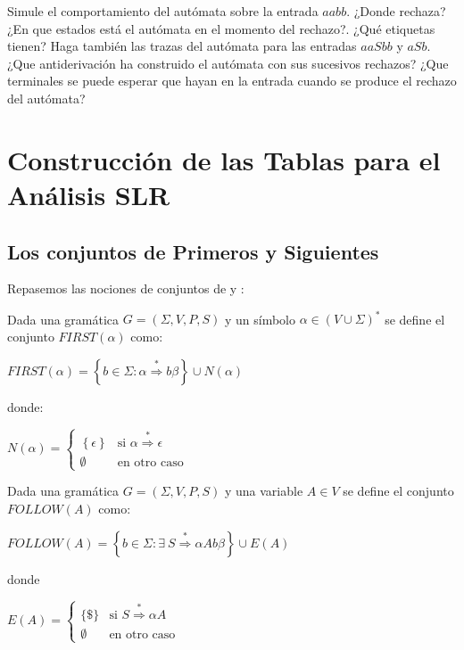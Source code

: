 \begin{exercise}
Simule el comportamiento del autómata sobre la entrada $aabb$. ¿Donde rechaza?
¿En que estados está el autómata en el momento del rechazo?. ¿Qué etiquetas tienen?
Haga también las
trazas del autómata para las entradas $aaSbb$ y $aSb$. ¿Que antiderivación 
ha construido el autómata con sus sucesivos rechazos? ¿Que terminales
se puede esperar que hayan en la entrada cuando se produce el rechazo
del autómata?
\end{exercise}

\section{Construcción de las Tablas para el Análisis SLR}

\subsection{Los conjuntos de Primeros y Siguientes}
Repasemos las nociones de conjuntos de  y :

\begin{definition}
Dada una gramática $G=(\Sigma,V,P,S)$ y un símbolo $\alpha \in (V \cup \Sigma)^*$ se define el conjunto $FIRST(\alpha)$ como:

$FIRST(\alpha) = \left \{ b \in \Sigma :  \alpha  \stackrel{*}{\Longrightarrow}  b \beta \right \}
\cup N(\alpha)$ 

\noindent donde:

$N(\alpha) = \left \{ \begin{array}{ll}
                         \left \{ \epsilon \right \}& \mbox{si $\alpha \stackrel{*}{\Longrightarrow} \epsilon$} \\
                         \emptyset & \mbox{en otro caso} 
                      \end{array}
             \right. $ 

\end{definition}

\begin{definition}
Dada una gramática $G=(\Sigma,V,P,S)$ y una variable $A \in V$ se define el conjunto $FOLLOW(A)$ como: 

$FOLLOW(A) = \left \{ b \in \Sigma :  \exists\ S  \stackrel{*}{\Longrightarrow}  \alpha A b \beta \right \} \cup E(A)$

\noindent donde

$E(A) = \left \{ \begin{array}{ll}
                         \{ \$  \}& \mbox{si $S \stackrel{*}{\Longrightarrow} \alpha A$} \\
                         \emptyset & \mbox{en otro caso} 
                      \end{array}
             \right. $ 

\end{definition}

